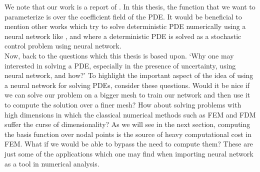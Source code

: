 We note that our work is a report of \cite{Base_paper}. In this thesis, the function that we want to parameterize is over the coefficient field of the PDE. 
It would be beneficial to mention other works which try to solve deterministic PDE numerically using a neural network like \cite{weinan2018deep, khoo2019solving, lagaris1998artificial, long2017pde, rudd2015constrained}, and \cite{han2018solving} where a deterministic PDE is solved as a stochastic control problem using neural network. \\
Now, back to the questions which this thesis is based upon. `Why one may interested in solving a PDE, especially in the presence of uncertainty, using neural network, and how?' To highlight the important aspect of the idea of using a neural network for solving PDEs, consider these questions. Would it be nice if we can solve our problem on a bigger mesh to train our network and then use it to compute the solution over a finer mesh? How about solving problems with high dimensions in which the classical numerical methods such as FEM and FDM suffer the curse of dimensionality? As we will see in the next section, computing the basis function over nodal points is the source of heavy computational cost in FEM. What if we would be able to bypass the need to compute them? These are just some of the applications which one may find when importing neural network as a tool in numerical analysis.\\
